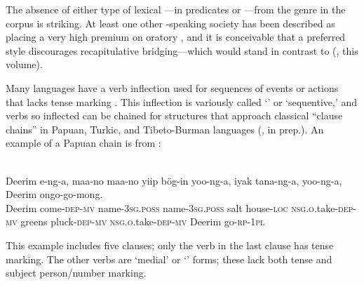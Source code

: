 \documentclass[output=paper]{LSP/langsci}
\begin{document}
The absence of either type of lexical —in predicates or —from the  genre in the corpus is striking. At least one other -speaking society has been described as placing a very high premium on oratory \citep{Albert1964}, and it is conceivable that a preferred   style discourages recapitulative bridging—which would stand in contrast to  (\citeauthor{emlen18}, this volume). 

Many  languages have a verb inflection used for sequences of events or actions that lacks tense marking \citep{Dalgish1979}. This inflection is variously called `' or `sequentive,' and verbs so inflected can be chained for structures that approach classical ``clause chains'' in Papuan, Turkic, and Tibeto-Burman languages (\citeauthor{sarvasyforth}, in prep.). An example of a Papuan chain is from :

\begin{exe}
	\ex	\label{Saex:1}
\\
\gll		Deerim e-ng-a, maa-no maa-no yiip bög-in yoo-ng-a, iyak tana-ng-a, yoo-ng-a, Deerim ongo-go-mong.\\
			Deerim come-\textsc{dep}-\textsc{mv} name-\textsc{3sg.poss} name-\textsc{3sg.poss} salt house-\textsc{loc} \textsc{nsg.o.}take\textsc{-dep}-\textsc{mv} greens pluck-\textsc{dep}-\textsc{mv } \textsc{nsg.o.}take\textsc{-dep}-\textsc{mv} Deerim go-\textsc{rp}-\textsc{1pl}\\
		\glt	{} \citep[][252]{Sarvasy2017}
\end{exe}

%

This example includes five clauses; only the verb in the last clause has tense marking. The other verbs are `medial' or `' forms; these lack both tense and subject person/number marking.
\end{document}
